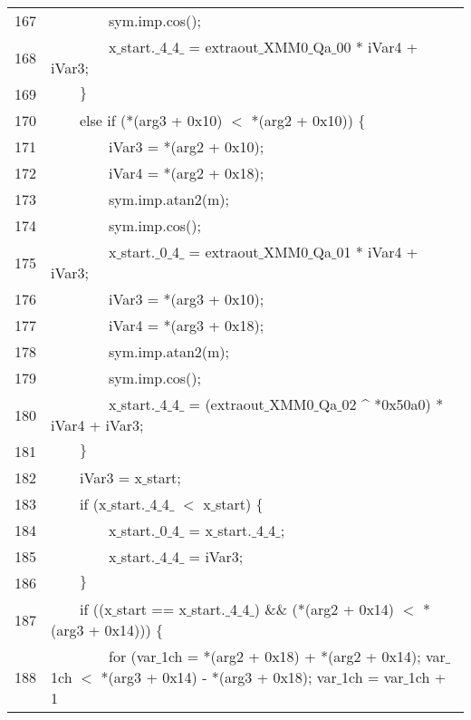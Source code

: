 \documentclass{report}
\newcommand{\tab}{$\quad$}
\newcommand{\csfont}[1]{\fontfamily{cmtt}\selectfont #1}
\begin{document}
\begin{tabular}{c|l}
  167 & {\csfont{\tab \tab \tab \tab sym.imp.cos();}} \\
  168 & {\csfont{\tab \tab \tab \tab x$\_$start.$\_$4$\_$4$\_$ = extraout$\_$XMM0$\_$Qa$\_$00 * iVar4 + iVar3;}} \\
  169 & {\csfont{\tab \tab $\}$}} \\
  170 & {\csfont{\tab \tab else if (*(arg3 + 0x10) $<$ *(arg2 + 0x10)) $\{$}} \\
  171 & {\csfont{\tab \tab \tab \tab iVar3 = *(arg2 + 0x10);}} \\
  172 & {\csfont{\tab \tab \tab \tab iVar4 = *(arg2 + 0x18);}} \\
  173 & {\csfont{\tab \tab \tab \tab sym.imp.atan2(m);}} \\
  174 & {\csfont{\tab \tab \tab \tab sym.imp.cos();}} \\
  175 & {\csfont{\tab \tab \tab \tab x$\_$start.$\_$0$\_$4$\_$ = extraout$\_$XMM0$\_$Qa$\_$01 * iVar4 + iVar3;}} \\
  176 & {\csfont{\tab \tab \tab \tab iVar3 = *(arg3 + 0x10);}} \\
  177 & {\csfont{\tab \tab \tab \tab iVar4 = *(arg3 + 0x18);}} \\
  178 & {\csfont{\tab \tab \tab \tab sym.imp.atan2(m);}} \\
  179 & {\csfont{\tab \tab \tab \tab sym.imp.cos();}} \\
  180 & {\csfont{\tab \tab \tab \tab x$\_$start.$\_$4$\_$4$\_$ = (extraout$\_$XMM0$\_$Qa$\_$02 \string^ *0x50a0) * iVar4 + iVar3;}} \\
  181 & {\csfont{\tab \tab $\}$}} \\
  182 & {\csfont{\tab \tab iVar3 = x$\_$start;}} \\
  183 & {\csfont{\tab \tab if (x$\_$start.$\_$4$\_$4$\_$ $<$ x$\_$start) $\{$}} \\
  184 & {\csfont{\tab \tab \tab \tab x$\_$start.$\_$0$\_$4$\_$ = x$\_$start.$\_$4$\_$4$\_$;}} \\
  185 & {\csfont{\tab \tab \tab \tab x$\_$start.$\_$4$\_$4$\_$ = iVar3;}} \\
  186 & {\csfont{\tab \tab $\}$}} \\
  187 & {\csfont{\tab \tab if ((x$\_$start == x$\_$start.$\_$4$\_$4$\_$) $\&$$\&$ (*(arg2 + 0x14) $<$ *(arg3 + 0x14))) $\{$}} \\
  188 & {\csfont{\tab \tab \tab \tab for (var$\_$1ch = *(arg2 + 0x18) + *(arg2 + 0x14); var$\_$1ch $<$ *(arg3 + 0x14) - *(arg3 + 0x18); var$\_$1ch = var$\_$1ch + 1}} \\

\end{tabular}
\end{document}
